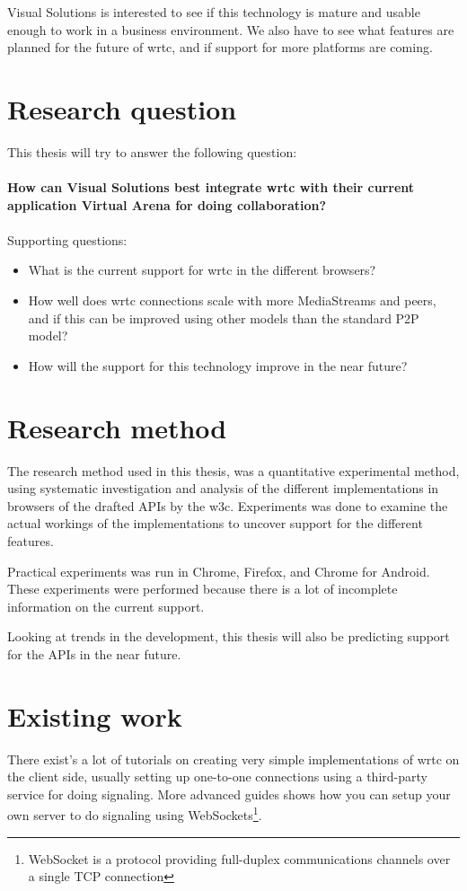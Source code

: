 Visual Solutions is interested to see if this technology is mature and usable enough to work in a business environment. We also have to see what features are planned for the future of \gls{wrtc}, and if support for more platforms are coming.


\section{Research question}
This thesis will try to answer the following question:
\\
\\
\textbf{How can Visual Solutions best integrate \gls{wrtc} with their current application Virtual Arena for doing collaboration?}
\\
\\
Supporting questions:

\begin{itemize}
    \item What is the current support for \gls{wrtc} in the different browsers?
    \item How well does \gls{wrtc} connections scale with more MediaStreams and peers, and if this can be improved using other models than the standard P2P model?
    \item How will the support for this technology improve in the near future?
\end{itemize}


\section{Research method}
The research method used in this thesis, was a quantitative experimental method, using systematic investigation and analysis of the different implementations in browsers of the drafted APIs by the \gls{w3c}. Experiments was done to examine the actual workings of the implementations to uncover support for the different features.

Practical experiments was run in Chrome, Firefox, and Chrome for Android. These experiments were performed because there is a lot of incomplete information on the current support.

Looking at trends in the development, this thesis will also be predicting support for the APIs in the near future.


\section{Existing work}
There exist's a lot of tutorials on creating very simple implementations of \gls{wrtc} on the client side, usually setting up one-to-one connections using a third-party service for doing signaling. More advanced guides shows how you can setup your own server to do signaling using WebSockets\footnote{WebSocket is a protocol providing full-duplex communications channels over a single TCP connection}.

